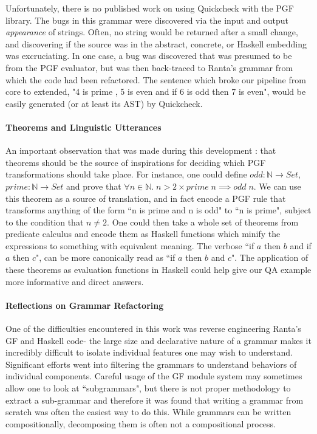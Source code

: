 Unfortunately, there is no published work on using Quickcheck \cite{quickCheck}
with the PGF library. The bugs in this grammar were discovered via the input and
output \emph{appearance} of strings. Often, no string would be returned after a
small change, and discovering if the source was in the abstract, concrete, or
Haskell embedding was excruciating. In one case, a bug was discovered that was
presumed to be from the PGF evaluator, but was then back-traced to Ranta's
grammar from which the code had been refactored. The sentence which broke our
pipeline from core to extended, "4 is prime , 5 is even and if 6 is odd then 7
is even", would be easily generated (or at least its AST) by Quickcheck.

\paragraph{Theorems and Linguistic Utterances}

An important observation that was made during this development : that theorems
should be the source of inspirations for deciding which PGF transformations
should take place. For instance, one could define $odd : \mathds{N} \rightarrow
Set$, $prime : \mathds{N} \rightarrow Set$ and prove that $\forall n \in
\mathds{N}.\; n > 2 \times prime\; n \implies odd\; n$. We can use this theorem
as a source of translation, and in fact encode a PGF rule that transforms
anything of the form ``n is prime and n is odd" to ``n is prime", subject to the
condition that $n \neq 2$. One could then take a whole set of theorems from
predicate calculus and encode them as Haskell functions which minify the
expressions to something with equivalent meaning. The verbose ``if $a$ then $b$
and if $a$ then $c$", can be more canonically read as ``if $a$ then $b$ and $c$".
The application of these theorems as evaluation functions in Haskell could help
give our QA example more informative and direct answers.

\paragraph{Reflections on Grammar Refactoring} One of the difficulties
encountered in this work was reverse engineering Ranta's GF and Haskell code-
the large size and declarative nature of a grammar makes it incredibly difficult
to isolate individual features one may wish to understand. Significant efforts
went into filtering the grammars to understand behaviors of individual
components. Careful usage of the GF module system may sometimes allow one to
look at ``subgrammars", but there is not proper methodology to extract a
sub-grammar and therefore it was found that writing a grammar from scratch was
often the easiest way to do this. While grammars can be written compositionally,
decomposing them is often not a compositional process.
